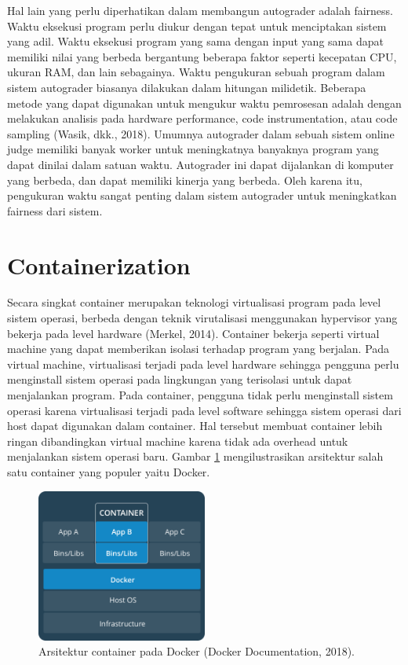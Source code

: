 \par Hal lain yang perlu diperhatikan dalam membangun autograder adalah fairness. Waktu eksekusi program perlu diukur dengan tepat untuk menciptakan sistem yang adil. Waktu eksekusi program yang sama dengan input yang sama dapat memiliki nilai yang berbeda bergantung beberapa faktor seperti kecepatan CPU, ukuran RAM, dan lain sebagainya. Waktu pengukuran sebuah program dalam sistem autograder biasanya dilakukan dalam hitungan milidetik. Beberapa metode yang dapat digunakan untuk mengukur waktu pemrosesan adalah dengan melakukan analisis pada hardware performance, code instrumentation, atau code sampling (Wasik, dkk., 2018). Umumnya autograder dalam sebuah sistem online judge memiliki banyak worker untuk meningkatnya banyaknya program yang dapat dinilai dalam satuan waktu. Autograder ini dapat dijalankan di komputer yang berbeda, dan dapat memiliki kinerja yang berbeda. Oleh karena itu, pengukuran waktu sangat penting dalam sistem autograder untuk meningkatkan fairness dari sistem.

\section{Containerization}

\par Secara singkat container merupakan teknologi virtualisasi program pada level sistem operasi, berbeda dengan teknik virutalisasi menggunakan hypervisor yang bekerja pada level hardware (Merkel, 2014). Container bekerja seperti virtual machine yang dapat memberikan isolasi terhadap program yang berjalan. Pada virtual machine, virtualisasi terjadi pada level hardware sehingga pengguna perlu menginstall sistem operasi pada lingkungan yang terisolasi untuk dapat menjalankan program. Pada container, pengguna tidak perlu menginstall sistem operasi karena virtualisasi terjadi pada level software sehingga sistem operasi dari host dapat digunakan dalam container. Hal tersebut membuat container lebih ringan dibandingkan virtual machine karena tidak ada overhead untuk menjalankan sistem operasi baru. Gambar \ref{fig:docker-architecture} mengilustrasikan arsitektur salah satu container yang populer yaitu Docker.

\begin{figure}
	\centering
	\includegraphics[width=0.5\textwidth]{images/docker-architecture}
	\caption{Arsitektur container pada Docker (Docker Documentation, 2018).}
	\label{fig:docker-architecture}
\end{figure}

